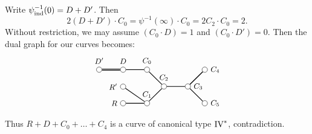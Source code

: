 \documentclass[oneside, 12pt]{amsart}
\theoremstyle{definition}
\theoremstyle{remark}
\newcommand{\IV}{\text{\rm IV}}
\newcommand{\ind}{\text{\rm ind}}
\newcommand{\inv}{{-1}}
\begin{document}
Write $\psi^\inv_\ind(0)=D+D'$. Then
$$
2(D+D')\cdot C_0=\psi^\inv(\infty)\cdot C_0 =2C_2\cdot C_0 = 2.
$$
Without restriction, we may assume $(C_0\cdot D)=1$ and $(C_0\cdot D')=0$.
Then the dual graph for our curves becomes:
\begin{equation*}
\begin{gathered}
\begin{tikzpicture}
[node distance=1cm, font=\small]
\tikzstyle{vertex}=[circle, draw, fill=white, inner sep=0mm, minimum size=1.5ex]
\node[vertex]	(C2)  	at (1,0)	[		label=above:{$C_2$}]	{};
\node[vertex]	(C3)	[right of=C2, 		label=right:{$C_3$}]	{};
\node[vertex]	(C4)	[above right of=C3, label=right:{$C_4$}]	{};
\node[vertex]	(C5)	[below right of=C3, label=right:{$C_5$}]	{};
\node[vertex]	(C0)	[above left of=C2, 	label=above:{$C_0$}]	{};
\node[vertex]	(C1)	[below left of=C2, 	label=above   :{$C_1$}]	{};
 
\node[vertex]	(R)	[left of=C1, 		label=left:{$R$}]	{};
\node[vertex]	(R')	[above  of=R, yshift=-.3cm,	label=left:{$R'$}]	{};
\node[vertex]	(D)	[left of=C0, 		label=above:{$D$}]	{};
\node[vertex]	(D')	[left of=D, 		label=above:{$D'$}]	{};

\draw [thick] (C2)--(C3)--(C4);
\draw [thick] (C0)--(C2)--(C1);
\draw [thick] (C5)--(C3)--(C4);
\draw [thick] (C0)--(D);
\draw [thick, double] (D')--(D);

\draw [thick] (R)--(C1)--(R');

\end{tikzpicture}
\end{gathered}
\end{equation*}
Thus $R+D+C_0+\ldots+C_4$ is a curve of canonical type $\IV^*$, contradiction.
\end{document}
